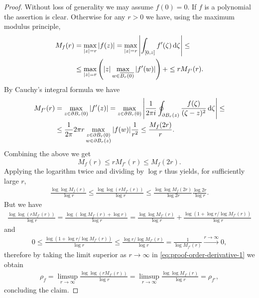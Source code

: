 \begin{proof}
    Without loss of generality we may assume $f(0) = 0$. If $f$ is a polynomial the assertion is clear. Otherwise for any $r > 0$ we have, using the maximum modulus principle,
    \begin{align*}
        M_f(r) &= \max_{\vert z \vert = r} \vert f(z) \vert = \max_{\vert z \vert = r} \left\vert \int_{[0, z]} f'(\zeta) \mathop{}\!\mathrm{d} \zeta \right\vert \leq \\
        &\leq \max_{\vert z \vert = r} \left( \vert z \vert \max_{w \in \overline{B_r(0)}} \vert f'(w) \vert \right) + \leq r M_{f'}(r).
    \end{align*}
    By Cauchy's integral formula we have
    \begin{align*}
        M_{f'}(r) &= \max_{z \in \partial B_r(0)} \vert f'(z) \vert = \max_{z \in \partial B_r(0)} \left\vert \frac{1}{2\pi i} \oint_{\partial B_r(z)} \frac{f(\zeta)}{(\zeta-z)^2} \mathop{}\!\mathrm{d} \zeta \right\vert \leq \\
        &\leq \frac{1}{2 \pi} 2 \pi r \max_{\substack{z \in \partial B_r(0) \\ w \in \partial B_r(z)}} \vert f(w) \vert \frac{1}{r^2} \leq \frac{M_f(2r)}{r}.
    \end{align*}
    Combining the above we get
    \begin{equation*}
        M_f(r) \leq r M_{f'}(r) \leq M_f(2r).
    \end{equation*}
    Applying the logarithm twice and dividing by $\log r$ thus yields, for sufficiently large $r$,
    \begin{align*}
        \frac{\log \log M_f(r)}{\log r} \leq \frac{\log \log (r M_{f'}(r))}{\log r} \leq \frac{\log \log M_f (2r)}{\log 2r} \frac{\log 2r}{\log r}. \tag{\textasteriskcentered} \label{eq:proof-order-derivative-1}
    \end{align*}
    But we have
    \begin{align*}
        \frac{\log \log (r M_{f'}(r))}{\log r} = \frac{\log (\log M_{f'}(r) + \log r)}{\log r} = \frac{\log \log M_{f'}(r)}{\log r} + \frac{\log(1 + \log r / \log M_{f'}(r))}{\log r}
    \end{align*}
    and
    \begin{align*}
        0 \leq \frac{\log(1 + \log r / \log M_{f'}(r))}{\log r} \leq \frac{\log r / \log M_{f'}(r)}{\log r} = \frac{1}{\log M_{f'}(r)} \xrightarrow{r \to \infty} 0,
    \end{align*}
    therefore by taking the limit superior as $r \to \infty$ in \eqref{eq:proof-order-derivative-1} we obtain
    \begin{align*}
        \rho_f = \limsup_{r \to \infty} \frac{\log \log (r M_{f'}(r))}{\log r} = \limsup_{r \to \infty} \frac{\log \log M_{f'}(r)}{\log r} = \rho_{f'},
    \end{align*}
    concluding the claim.
\end{proof}

